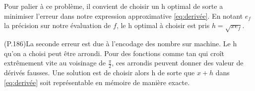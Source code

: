 \documentclass{article}
\begin{document}
Pour palier à ce problème, il convient de choisir un h optimal de sorte a minimiser l'erreur dans notre expression approximative \ref{eq:derivée}. En notant $e_f$ la précision sur notre évaluation de $f$, le h optimal à choisir est pris $h = \sqrt{xe_f}$.
\newline

(P.186)La seconde erreur est due à l'encodage des nombre sur machine. Le h qu'on a choisi peut être arrondi. Pour des fonctions comme tan qui croît extrêmement vite au voisinage de $\frac{\pi}{2}$, ces arrondis peuvent donner des valeur de dérivés fausses. Une solution est de choisir alors h de sorte que $x+h$ dans \ref{eq:derivée} soit représentable en mémoire de manière exacte.
\end{document}
